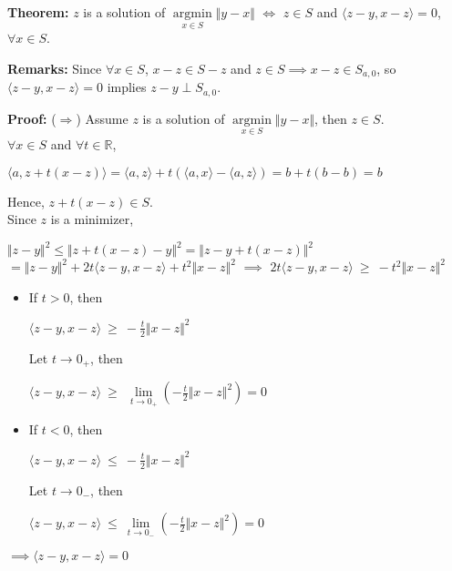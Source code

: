 \documentclass{article}
\begin{document}
\pagebreak

\textbf{Theorem:} $z$ is a solution of $\underset{x \in S}{\operatorname*{argmin}} \Vert y - x \Vert$ $\iff$ $z \in S$ and $\langle z-y,x-z\rangle  = 0$, $\forall x \in S$. 

\bigbreak
\textbf{Remarks:} Since $\forall x \in S$, $x - z \in S - z$ and $z 
\in S \implies x - z \in S_{a,0}$, so $\langle z-y,x-z\rangle  = 0$ implies $z-y \perp S_{a,0}$.

\bigbreak
\textbf{Proof:} ($\Rightarrow$) Assume $z$ is a solution of $\underset{x \in S}{\operatorname*{argmin}} \Vert y - x \Vert$, then $z \in S$. \\
$\forall x \in S$ and $\forall t \in \mathbb{R}$, 
\begin{center}
    $\langle a, z+t(x-z)\rangle  = \langle a,z\rangle  + t(\langle a,x\rangle -\langle a,z\rangle ) = b + t(b-b) = b$
    
\end{center}
Hence, $z + t(x-z) \in S$. \\
Since $z$ is a minimizer,
\begin{center}
    $\Vert z - y \Vert^2 \leq \Vert z + t(x - z) - y\Vert^2 = \Vert z - y + t(x-z) \Vert^2$
    \bigbreak $= \Vert z - y \Vert^2 + 2t\langle z-y,x-z\rangle  + t^2 \Vert x - z\Vert^2$ \bigbreak $\implies$ $2t\langle z-y,x-z\rangle  \ \geq \ -t^2 \Vert x - z \Vert^2$
\end{center}

\begin{itemize}
    \item If $t >  0$, then
    \begin{center}
        $\langle z-y,x-z\rangle  \ \geq \ -\frac{t}{2} \Vert x - z \Vert^2$
    \end{center}
    Let $ t \to 0_+$, then
    \begin{center}
        $\langle z-y,x-z\rangle  \ \geq \ \ \underset{t \to 0_+}{\lim} (-\frac{t}{2} \Vert x - z \Vert^2) = 0$
    \end{center}
    \item If $t < 0$, then
    \begin{center}
        $\langle z-y,x-z\rangle  \ \leq \ -\frac{t}{2} \Vert x - z \Vert^2$
    \end{center}
    Let $ t \to 0_-$, then
    \begin{center}
        $\langle z-y,x-z\rangle  \ \leq \ \underset{t \to 0_-}{\lim}(-\frac{t}{2} \Vert x - z \Vert^2) = 0$
    \end{center}
\end{itemize}
$\implies \langle z-y,x-z\rangle  = 0$ \bigbreak
\end{document}
